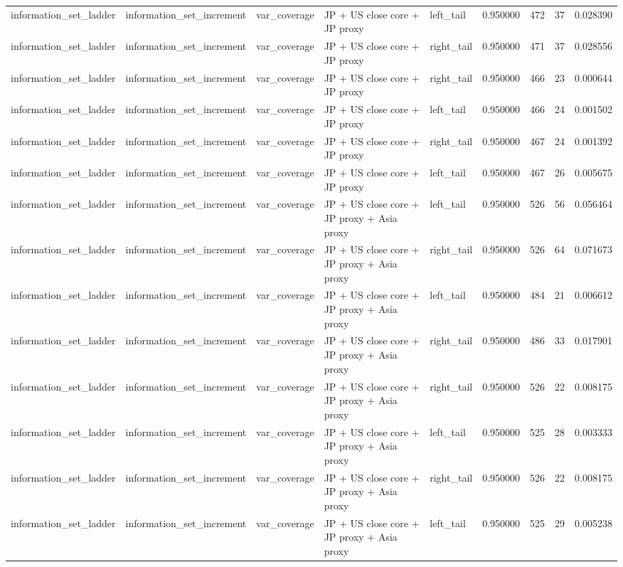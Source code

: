 \begin{tabular}{lllllrrrr}
information\_set\_ladder & information\_set\_increment & var\_coverage & JP + US close core + JP proxy & left\_tail & 0.950000 & 472 & 37 & 0.028390 \\
information\_set\_ladder & information\_set\_increment & var\_coverage & JP + US close core + JP proxy & right\_tail & 0.950000 & 471 & 37 & 0.028556 \\
information\_set\_ladder & information\_set\_increment & var\_coverage & JP + US close core + JP proxy & right\_tail & 0.950000 & 466 & 23 & 0.000644 \\
information\_set\_ladder & information\_set\_increment & var\_coverage & JP + US close core + JP proxy & left\_tail & 0.950000 & 466 & 24 & 0.001502 \\
information\_set\_ladder & information\_set\_increment & var\_coverage & JP + US close core + JP proxy & right\_tail & 0.950000 & 467 & 24 & 0.001392 \\
information\_set\_ladder & information\_set\_increment & var\_coverage & JP + US close core + JP proxy & left\_tail & 0.950000 & 467 & 26 & 0.005675 \\
information\_set\_ladder & information\_set\_increment & var\_coverage & JP + US close core + JP proxy + Asia proxy & left\_tail & 0.950000 & 526 & 56 & 0.056464 \\
information\_set\_ladder & information\_set\_increment & var\_coverage & JP + US close core + JP proxy + Asia proxy & right\_tail & 0.950000 & 526 & 64 & 0.071673 \\
information\_set\_ladder & information\_set\_increment & var\_coverage & JP + US close core + JP proxy + Asia proxy & left\_tail & 0.950000 & 484 & 21 & 0.006612 \\
information\_set\_ladder & information\_set\_increment & var\_coverage & JP + US close core + JP proxy + Asia proxy & right\_tail & 0.950000 & 486 & 33 & 0.017901 \\
information\_set\_ladder & information\_set\_increment & var\_coverage & JP + US close core + JP proxy + Asia proxy & right\_tail & 0.950000 & 526 & 22 & 0.008175 \\
information\_set\_ladder & information\_set\_increment & var\_coverage & JP + US close core + JP proxy + Asia proxy & left\_tail & 0.950000 & 525 & 28 & 0.003333 \\
information\_set\_ladder & information\_set\_increment & var\_coverage & JP + US close core + JP proxy + Asia proxy & right\_tail & 0.950000 & 526 & 22 & 0.008175 \\
information\_set\_ladder & information\_set\_increment & var\_coverage & JP + US close core + JP proxy + Asia proxy & left\_tail & 0.950000 & 525 & 29 & 0.005238 \\

\end{tabular}
